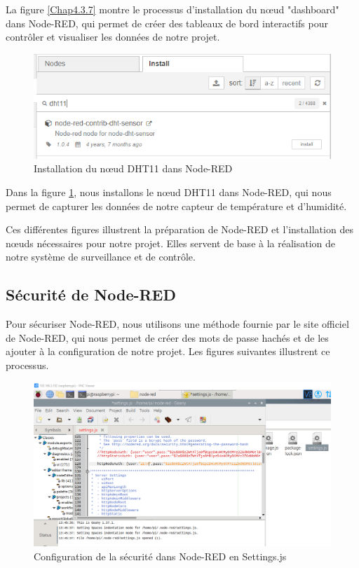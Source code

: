 La figure \ref{Chap4.3.7} montre le processus d'installation du nœud "dashboard" dans Node-RED, qui permet de créer des tableaux de bord interactifs pour contrôler et visualiser les données de notre projet.

\begin{figure}[H]
\centering
\includegraphics[width=15cm]{Images/DHT11-Node-Red-Install.png}
\caption{Installation du nœud DHT11 dans Node-RED}
\label{Chap4.3.8}
\end{figure}

Dans la figure \ref{Chap4.3.8}, nous installons le nœud DHT11 dans Node-RED, qui nous permet de capturer les données de notre capteur de température et d'humidité.

Ces différentes figures illustrent la préparation de Node-RED et l'installation des nœuds nécessaires pour notre projet. Elles servent de base à la réalisation de notre système de surveillance et de contrôle.


\subsection{Sécurité de Node-RED}

Pour sécuriser Node-RED, nous utilisons une méthode fournie par le site officiel de Node-RED, qui nous permet de créer des mots de passe hachés et de les ajouter à la configuration de notre projet. Les figures suivantes illustrent ce processus.

\begin{figure}[H]
\centering
\includegraphics[width=14cm]{Images/Node-2.png}
\caption{Configuration de la sécurité dans Node-RED en Settings.js}
\label{Chap4.3.9}
\end{figure}

